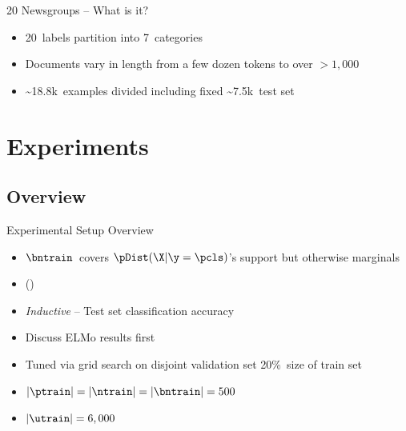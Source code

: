 \begin{frame}{20 Newsgroups -- What is it?}
  \begin{itemize}
    \item 20~labels partition into 7~categories 
    \item Documents vary in length from a few dozen tokens to over ${{>}1,000}$
  \end{itemize}
  \vfill
   
  \begin{itemize}[<+->]
    \item \textasciitilde18.8k~examples divided including fixed \textasciitilde7.5k~test set
  \end{itemize}
  \vfill
  {
    \begin{center}
      \scriptsize
      \onslide<+->{}
    \end{center}
  }
\end{frame}

\section{Experiments}
\subsection{Overview}
\begin{frame}{Experimental Setup Overview}
  \begin{itemize}[<+->]
    \setlength{\itemsep}{6pt}
    \item $\bntrain$~covers  ${\pDist(\X \vert \y = \pcls)}$'s support but otherwise marginals 
    \item () 
  \end{itemize}
  \vfill
  \begin{itemize}[<+->]
    \setlength{\itemsep}{6pt}
    \item \textit{Inductive} -- Test set classification accuracy
    \item Discuss ELMo results first 
  \end{itemize}
  \vfill
  \begin{itemize}[<+->]
    \setlength{\itemsep}{6pt}
    \item Tuned via grid search on disjoint validation set 20\%~size of train set
    \item ${\abs{\ptrain} = \abs{\ntrain} = \abs{\bntrain} = 500}$
    \item ${\abs{\utrain} = 6,000}$
  \end{itemize}
\end{frame}

